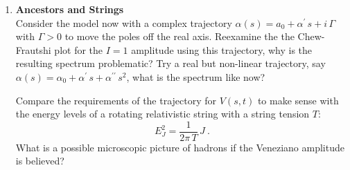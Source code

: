 \begin{enumerate}
    \item \textbf{Ancestors and Strings}\\
          Consider the model now with a complex trajectory $\alpha(s) = a_0 + \alpha^\prime \, s + i \,\Gamma$ with $\Gamma > 0$ to move the poles off the real axis. Reexamine the the Chew-Frautshi plot for the $I=1$ amplitude using this trajectory, why is the resulting spectrum problematic? Try a real but non-linear trajectory, say $\alpha(s) = \alpha_0 + \alpha^\prime \, s + \alpha^{\prime\prime} \, s^2$, what is the spectrum like now?

          Compare the requirements of the trajectory for $V(s,t)$ to make sense with the energy levels of a rotating relativistic string with a string tension $T$:
          \begin{equation}
              E_J^2 = \frac{1}{2\pi \, T} \, J ~.
          \end{equation}
          What is a possible microscopic picture of hadrons if the Veneziano amplitude is believed?
\end{enumerate}
